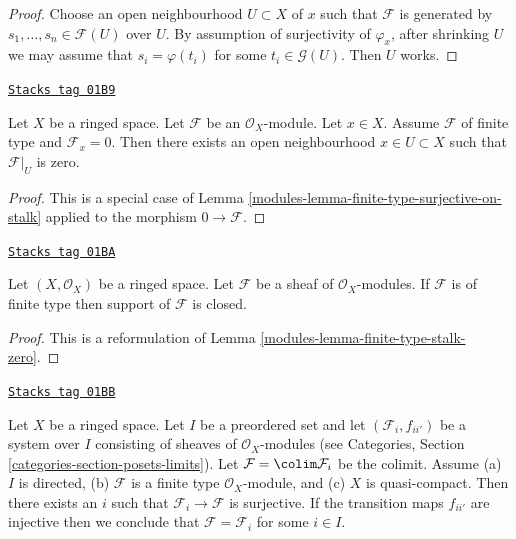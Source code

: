 \begin{proof}
Choose an open neighbourhood $U \subset X$ of $x$ such that $\mathcal{F}$ is
generated by $s_1, \ldots, s_n \in \mathcal{F}(U)$ over $U$.
By assumption of surjectivity of $\varphi_x$,
after shrinking $U$ we may assume that $s_i = \varphi(t_i)$
for some $t_i \in \mathcal{G}(U)$.
Then $U$ works.
\end{proof}

\begin{lemma}
\label{modules-lemma-finite-type-stalk-zero}
\href{https://stacks.math.columbia.edu/tag/01B9}{\texttt{Stacks tag 01B9}}

Let $X$ be a ringed space.
Let $\mathcal{F}$ be an $\mathcal{O}_X$-module.
Let $x \in X$.
Assume $\mathcal{F}$ of finite type and $\mathcal{F}_x = 0$.
Then there exists an open neighbourhood
$x \in U \subset X$ such that $\mathcal{F}|_U$ is zero.
\end{lemma}

\begin{proof}

This is a special case of
Lemma \ref{modules-lemma-finite-type-surjective-on-stalk}
applied to the morphism $0 \to \mathcal{F}$.
\end{proof}

\begin{lemma}
\label{modules-lemma-support-finite-type-closed}
\href{https://stacks.math.columbia.edu/tag/01BA}{\texttt{Stacks tag 01BA}}


Let $(X, \mathcal{O}_X)$ be a ringed space.
Let $\mathcal{F}$ be a sheaf of $\mathcal{O}_X$-modules.
If $\mathcal{F}$ is of finite type then support of $\mathcal{F}$ is closed.
\end{lemma}

\begin{proof}

This is a reformulation of Lemma \ref{modules-lemma-finite-type-stalk-zero}.
\end{proof}

\begin{lemma}
\label{modules-lemma-finite-type-quasi-compact-colimit}
\href{https://stacks.math.columbia.edu/tag/01BB}{\texttt{Stacks tag 01BB}}

Let $X$ be a ringed space. Let $I$ be a preordered set and
let $(\mathcal{F}_i, f_{ii'})$ be a system over $I$ consisting of sheaves
of $\mathcal{O}_X$-modules (see
Categories, Section \ref{categories-section-posets-limits}).
Let $\mathcal{F} = \colim \mathcal{F}_i$ be the colimit. Assume
(a) $I$ is directed,
(b) $\mathcal{F}$ is a finite type $\mathcal{O}_X$-module, and
(c) $X$ is quasi-compact. Then there exists an $i$ such that
$\mathcal{F}_i \to \mathcal{F}$ is surjective.
If the transition maps $f_{ii'}$ are injective
then we conclude that $\mathcal{F} = \mathcal{F}_i$ for some $i \in I$.
\end{lemma}

